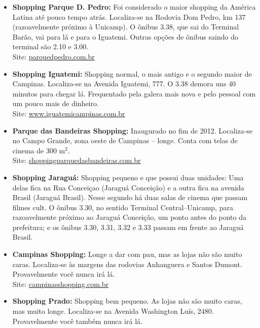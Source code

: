 \begin{itemize}

\item   \textbf{Shopping Parque D. Pedro:} Foi considerado o maior shopping da
        América Latina até pouco tempo atrás. Localiza-se na Rodovia Dom Pedro,
        km 137 (razoavelmente próximo à Unicamp). O ônibus 3.38, que sai do
        Terminal Barão, vai para lá e para o Iguatemi. Outras opções de ônibus
        saindo do terminal são 2.10 e 3.00.
        \\Site: \url{parquedpedro.com.br}

\item   \textbf{Shopping Iguatemi:} Shopping normal, o mais antigo e o segundo
        maior de Campinas. Localiza-se na Avenida Iguatemi, 777. O 3.38 demora
        uns 40 minutos para chegar lá. Frequentado pela galera mais nova e pelo
        pessoal com um pouco mais de dinheiro.
        \\Site: \url{www.iguatemicampinas.com.br}

\item   \textbf{Parque das Bandeiras Shopping:} Inaugurado no fim de 2012.
        Localiza-se no Campo Grande, zona oeste de Campinas -- longe. Conta com
        telas de cinema de 300 m$^{2}$.
        \\Site: \url{shoppingparquedasbandeiras.com.br}

\item   \textbf{Shopping Jaraguá:} Shopping pequeno e que possui duas unidades:
        Uma delas fica na Rua Conceiçao (Jaraguá Conceição) e a outra fica na
        avenida Brasil (Jaraguá Brasil). Nesse segundo há duas salas de cinema
        que passam filmes cult. O ônibus 3.30, no sentido Terminal
        Central--Unicamp, para razoavelmente próximo ao Jaraguá Conceição, um
        ponto antes do ponto da prefeitura; e os ônibus 3.30, 3.31, 3.32 e 3.33
        passam em frente ao Jaraguá Brasil.

\item   \textbf{Campinas Shopping:} Longe a dar com pau, mas as lojas não são
        muito caras. Localiza-se às margens das rodovias Anhanguera e Santos
        Dumont. Provavelmente você nunca irá lá.
        \\Site: \url{campinasshopping.com.br}

\item   \textbf{Shopping Prado:} Shopping bem pequeno. As lojas não são muito
        caras, mas muito longe. Localiza-se na Avenida Washington Luís, 2480.
        Provavelmente você também nunca irá lá.


\end{itemize}

